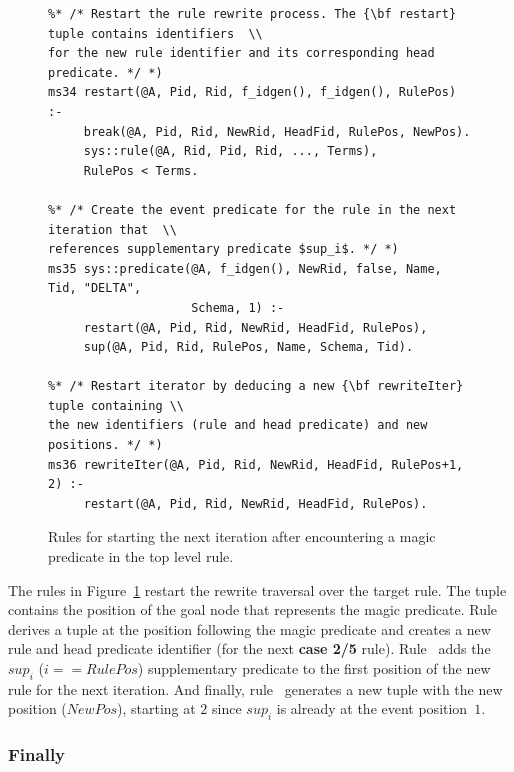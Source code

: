\begin{figure}[!t]
\ssp
\centering
\begin{lstlisting}
%* /* Restart the rule rewrite process. The {\bf restart} tuple contains identifiers  \\
for the new rule identifier and its corresponding head predicate. */ *)
ms34 restart(@A, Pid, Rid, f_idgen(), f_idgen(), RulePos) :-
     break(@A, Pid, Rid, NewRid, HeadFid, RulePos, NewPos).
     sys::rule(@A, Rid, Pid, Rid, ..., Terms),
     RulePos < Terms.
	
%* /* Create the event predicate for the rule in the next iteration that  \\
references supplementary predicate $sup_i$. */ *)
ms35 sys::predicate(@A, f_idgen(), NewRid, false, Name, Tid, "DELTA", 
                    Schema, 1) :-
     restart(@A, Pid, Rid, NewRid, HeadFid, RulePos),
     sup(@A, Pid, Rid, RulePos, Name, Schema, Tid).
	
%* /* Restart iterator by deducing a new {\bf rewriteIter} tuple containing \\
the new identifiers (rule and head predicate) and new positions. */ *)
ms36 rewriteIter(@A, Pid, Rid, NewRid, HeadFid, RulePos+1, 2) :-
     restart(@A, Pid, Rid, NewRid, HeadFid, RulePos).
\end{lstlisting}
\caption{\label{ch:magic:fig:rewrite8}Rules for starting the next iteration after
encountering a magic predicate in the top level rule. }
\end{figure}

The rules in Figure~\ref{ch:magic:fig:rewrite8} restart the rewrite traversal
over the target rule.  The  tuple contains the position of the goal
node that represents the magic predicate.  Rule~ derives a
 tuple at the position following the magic predicate and creates a
new rule and head predicate identifier (for the next {\bf case 2/5} rule).
Rule~ adds the $sup_i$ ($i==RulePos$) supplementary predicate to
the first position of the new rule for the next iteration.  And finally,
rule~ generates a new  tuple with the new position
($NewPos$), starting at $2$ since $sup_{i}$ is already at the event 
position~$1$.

\subsubsection{Finally}

